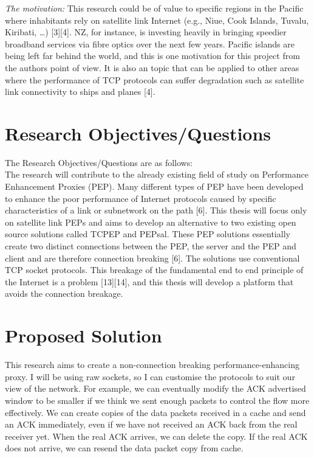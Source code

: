 \documentclass{uathesis}
\begin{document}
\emph{The motivation:} This research could be of value to specific regions in the Pacific where inhabitants rely on satellite link Internet (e.g., Niue, Cook Islands, Tuvalu, Kiribati, …) [3][4]. NZ, for instance, is investing heavily in bringing speedier broadband services via fibre optics over the next few years. Pacific islands are being left far behind the world, and this is one motivation for this project from the authors point of view. It is also an topic that can be applied to other areas where the performance of TCP protocols can suffer degradation such as satellite link connectivity to ships and planes [4].

\section{Research Objectives/Questions}
The Research Objectives/Questions are as follows:\\

The research will contribute to the already existing field of study on Performance Enhancement Proxies (PEP). Many different types of PEP have been developed to enhance the poor performance of Internet protocols caused by specific characteristics of a link or subnetwork on the path [6]. This thesis will focus only on satellite link PEPs and aims to develop an alternative to two existing open source solutions called TCPEP and PEPsal. These PEP solutions essentially create two distinct connections between the PEP, the server and the PEP and client and are therefore connection breaking [6]. The solutions use conventional TCP socket protocols. This breakage of the fundamental end to end principle of the Internet is a problem [13][14], and this thesis will develop a platform that avoids the connection breakage. \\

\section{Proposed Solution}
This research aims to create a non-connection breaking performance-enhancing proxy. I will be using raw sockets, so I can customise the protocols to suit our view of the network. For example, we can eventually modify the ACK advertised window to be smaller if we think we sent enough packets to control the flow more effectively. We can create copies of the data packets received in a cache and send an ACK immediately, even if we have not received an ACK back from the real receiver yet. When the real ACK arrives, we can delete the copy. If the real ACK does not arrive, we can resend the data packet copy from cache.\\
\end{document}
